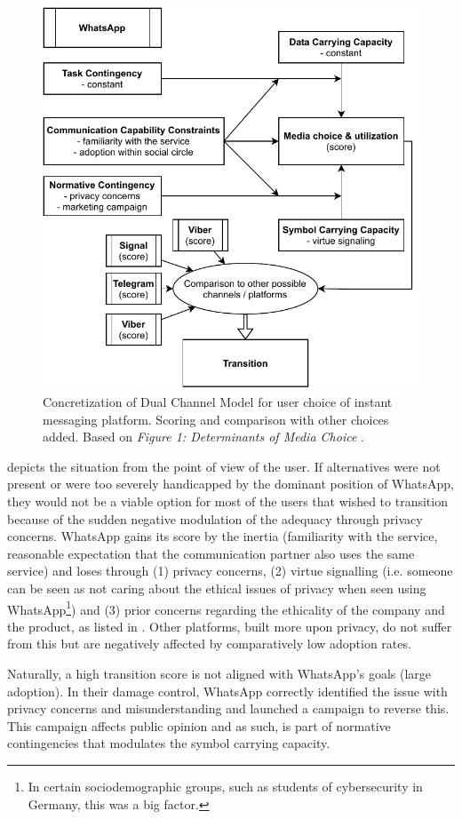 \begin{figure}[ht]
\centering
\includegraphics[width=0.77\linewidth]{img/dcm_user_choice.pdf}
\caption{Concretization of Dual Channel Model for user choice of instant messaging platform. Scoring and comparison with other choices added. Based on \textit{Figure 1: Determinants of Media Choice} \citep{sitkin1992dual}.}
\label{fig:dcm_user_choice}
\end{figure}

 depicts the situation from the point of view of the user.
If alternatives were not present or were too severely handicapped by the dominant position of WhatsApp, they would not be a viable option for most of the users that wished to transition because of the sudden negative modulation of the adequacy through privacy concerns.
WhatsApp gains its score by the inertia (familiarity with the service, reasonable expectation that the communication partner also uses the same service) and loses through (1) privacy concerns, (2) virtue signalling (i.e. someone can be seen as not caring about the ethical issues of privacy when seen using WhatsApp\footnote{In certain sociodemographic groups, such as students of cybersecurity in Germany, this was a big factor.}) and (3) prior concerns regarding the ethicality of the company and the product, as listed in .
Other platforms, built more upon privacy, do not suffer from this but are negatively affected by comparatively low adoption rates.

Naturally, a high transition score is not aligned with WhatsApp's goals (large adoption).
In their damage control, WhatsApp correctly identified the issue with privacy concerns and misunderstanding and launched a campaign to reverse this.
This campaign affects public opinion and as such, is part of normative contingencies that modulates the symbol carrying capacity.

